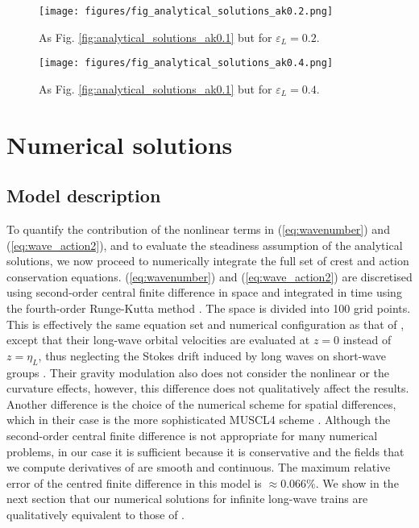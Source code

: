 \documentclass[lineno]{jfm}
\begin{document}
\begin{figure}
\centering
\texttt{[image: figures/fig\_analytical\_solutions\_ak0.2.png]}
\caption{As Fig. \ref{fig:analytical_solutions_ak0.1} but for $\varepsilon_L = 0.2$.}
\label{fig:analytical_solutions_ak0.2}
\end{figure}

\begin{figure}
\centering
\texttt{[image: figures/fig\_analytical\_solutions\_ak0.4.png]}
\caption{As Fig. \ref{fig:analytical_solutions_ak0.1} but for $\varepsilon_L = 0.4$.}
\label{fig:analytical_solutions_ak0.4}
\end{figure}

\section{Numerical solutions}
\label{section:numerical_solutions}

\subsection{Model description}

To quantify the contribution of the nonlinear terms in (\ref{eq:wavenumber})
and (\ref{eq:wave_action2}), and to evaluate the steadiness assumption of the
analytical solutions, we now proceed to numerically integrate the full set of
crest and action conservation equations.
(\ref{eq:wavenumber}) and (\ref{eq:wave_action2}) are discretised using
second-order central finite difference in space and integrated in time using the
fourth-order Runge-Kutta method \citep{butcher1996runge}.
The space is divided into 100 grid points.
This is effectively the same equation set and numerical configuration as that of
\citet{peureux2021unsteady}, except that their long-wave orbital velocities are
evaluated at $z=0$ instead of $z=\eta_L$, thus neglecting the Stokes drift
induced by long waves on short-wave groups
\citep{stokes1847,van2018stokes,monismith2020stokes}.
Their gravity modulation also does not consider the nonlinear or the curvature
effects, however, this difference does not qualitatively affect the results.
Another difference is the choice of the numerical scheme for spatial differences,
which in their case is the more sophisticated MUSCL4 scheme \citep{kurganov2000new}.
Although the second-order central finite difference is not appropriate for many
numerical problems, in our case it is sufficient because it is conservative and
the fields that we compute derivatives of are smooth and continuous.
The maximum relative error of the centred finite difference in this model
is $\approx 0.066\%$.
We show in the next section that our numerical solutions for infinite long-wave
trains are qualitatively equivalent to those of \citet{peureux2021unsteady}.
\end{document}
